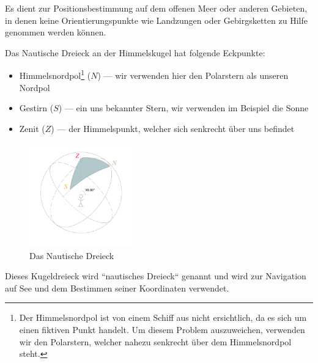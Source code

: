 \begin{refsection}
Es dient zur Positionsbestimmung auf dem offenen Meer oder anderen
Gebieten, in denen keine Orientierungspunkte wie Landzungen oder
Gebirgsketten zu Hilfe genommen werden können.

Das Nautische Dreieck an der Himmelskugel hat folgende Eckpunkte:
\begin{itemize}
\item Himmelsnordpol\footnote{%
Der Himmelsnordpol ist von einem Schiff aus nicht ersichtlich, da
es sich um einen fiktiven Punkt handelt. Um diesem Problem auszuweichen,
verwenden wir den Polarstern, welcher nahezu senkrecht über dem
Himmelsnordpol steht.}
 ($N$) --- wir verwenden hier den Polarstern als unseren Nordpol
\item Gestirn ($S$) --- ein uns bekannter Stern, wir verwenden im
Beispiel die Sonne
\item Zenit ($Z$) --- der Himmelspunkt, welcher sich senkrecht über
uns befindet
\end{itemize}

\begin{figure}[htbp]
\centering
\includegraphics[width=0.4\textwidth]{kugel/NautischesDreieck.jpg}
\caption{Das Nautische Dreieck}
\end{figure}

Dieses Kugeldreieck wird “nautisches Dreieck“ genannt und wird zur
Navigation auf See und dem Bestimmen seiner Koordinaten verwendet.


\end{refsection}

